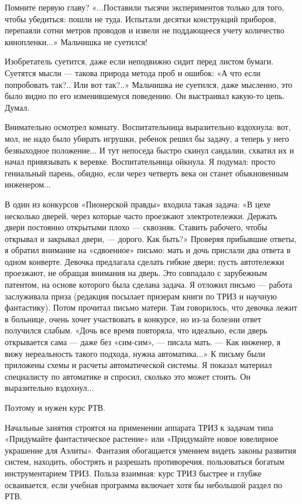 Помните первую  главу? «...Поставили  тысячи экспериментов  только для
того,  чтобы убедиться:  пошли не  туда. Испытали  десятки конструкций
приборов,  перепаяли сотни  метров  проводов и  извели не  поддающееся
учету количество кинопленки...» Мальчишка не суетился!

Изобретатель суетится, даже если неподвижно сидит перед листом бумаги.
Суетятся мысли  — такова  природа метода  проб и  ошибок: «А  что если
попробовать  так?..  Или  вот  так?..»  Мальчишка  не  суетился,  даже
мысленно, это было видно по его изменившемуся поведению. Он выстраивал
какую-то цепь. Думал.

Внимательно осмотрел комнату.  Воспитательница выразительно вздохнула:
вот, мол,  не надо было  убирать игрушки,  ребенок решил бы  задачу, а
теперь у  него безвыходное положение...  И тут непоседа  быстро скинул
сандалии, схватил  их и  начал привязывать к  веревке. Воспитательница
ойкнула.  Я  подумал: просто  гениальный  парень,  обидно, если  через
четверть века он станет обыкновенным инженером...


В  один из  конкурсов  «Пионерской правды»  входила  такая задача:  «В
цехе несколько  дверей, через которые часто  проезжают электротележки.
Держать двери постоянно открытыми  плохо — сквозняк. Ставить рабочего,
чтобы  открывал  и  закрывал  двери, —  дорого.  Как  быть?»  Проверяя
прибывшие ответы,  я обратил  внимание на  «сдвоенное» письмо:  мать и
дочь прислали два ответа в  одном конверте. Девочка предлагала сделать
гибкие  двери; пусть  автотележки  проезжают, не  обращая внимания  на
дверь. Это  совпадало с зарубежным  патентом, на основе  которого была
сделана задача. Я отложил письмо  — работа заслуживала приза (редакция
посылает призерам книги по ТРИЗ  и научную фантастику). Потом прочитал
письмо матери.  Там говорилось,  что девочка  лежит в  больнице, очень
хочет участвовать в конкурсе, но из-за болезни ответ получился слабым.
«Дочь все время повторяла, что идеально, если дверь открывается сама —
даже без «сим-сим», — писала мать.  — Как инженер, я вижу нереальность
такого подхода, нужна  автоматика...» К письму были  приложены схемы и
расчеты  автоматической системы.  Я  показал  материал специалисту  по
автоматике  и  спросил,  сколько  это может  стоить.  Он  выразительно
вздохнул...


Поэтому и нужен курс РТВ.

Начальные  занятия  строятся на  применении  аппарата  ТРИЗ к  задачам
типа  «Придумайте  фантастическое   растение»  или  «Придумайте  новое
ювелирное украшение  для Аэлиты». Фантазия обогащается  умением видеть
законы развития систем, находить,  обострять и разрешать противоречия,
пользоваться богатым инструментарием ТРИЗ.  Польза взаимная: курс ТРИЗ
быстрее и глубже осваивается, если  учебная программа включает хотя бы
небольшой раздел по РТВ.

